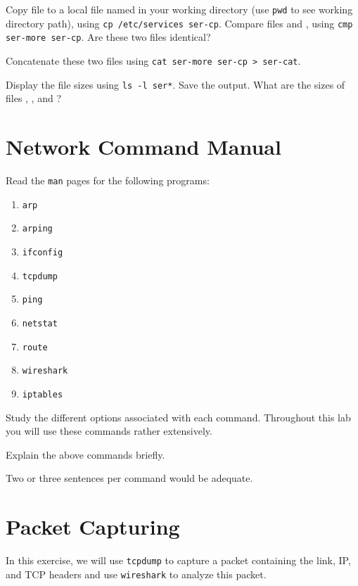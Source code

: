 \documentclass{../UTNetLab}
\begin{document}
    Copy  file to a local file named  in your working directory (use \lstinline{pwd} to see working directory path),
    using \lstinline{cp /etc/services ser-cp}. Compare files  and , using \lstinline{cmp ser-more ser-cp}. Are these two files identical?

    Concatenate these two files using \lstinline{cat ser-more ser-cp > ser-cat}.

    Display the file sizes using \lstinline{ls -l ser*}. Save the output. What are the sizes of files , , and ?

\section{Network Command Manual}
    Read the \lstinline{man} pages for the following programs:
    \begin{multicols}{3}
        \begin{enumerate}
            \item \lstinline{arp}
            \item \lstinline{arping}
            \item \lstinline{ifconfig}
            \item \lstinline{tcpdump}
            \item \lstinline{ping}
            \item \lstinline{netstat}
            \item \lstinline{route}
            \item \lstinline{wireshark}
            \item \lstinline{iptables}
        \end{enumerate}
    \end{multicols}
    Study the different options associated with each command.
    Throughout this lab you will use these commands rather extensively.
    
    \begin{report}
    \item Explain the above commands briefly.
    \item Two or three sentences per command would be adequate.
    \end{report}

\section{Packet Capturing}
    In this exercise, we will use \lstinline{tcpdump} to capture a packet containing the link, IP, and TCP headers and use \lstinline{wireshark} to analyze this packet.
\end{document}
